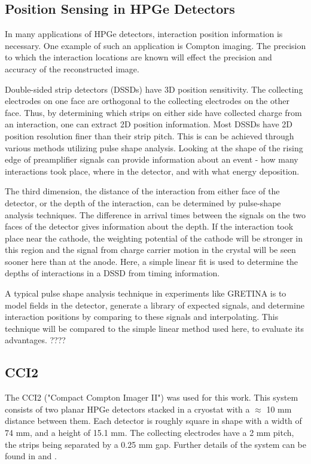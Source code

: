 \subsection*{Position Sensing in HPGe Detectors}

In many applications of HPGe detectors, interaction position information is necessary. One example of such an application is Compton imaging. The precision to which the interaction locations are known will effect the precision and accuracy of the reconstructed image.

Double-sided strip detectors (DSSDs) have 3D position sensitivity. The collecting electrodes on one face are orthogonal to the collecting electrodes on the other face. Thus, by determining which strips on either side have collected charge from an interaction, one can extract 2D position information. Most DSSDs have 2D position resolution finer than their strip pitch. This is can be achieved through various methods utilizing pulse shape analysis. Looking at the shape of the rising edge of preamplifier signals can provide information about an event - how many interactions took place, where in the detector, and with what energy deposition. 

The third dimension, the distance of the interaction from either face of the detector, or the depth of the interaction, can be determined by pulse-shape analysis techniques. The difference in arrival times between the signals on the two faces of the detector gives information about the depth. If the interaction took place near the cathode, the weighting potential of the cathode will be stronger in this region and the signal from charge carrier motion in the crystal will be seen sooner here than at the anode. Here, a simple linear fit is used to determine the depths of interactions in a DSSD from timing information.

A typical pulse shape analysis technique in experiments like GRETINA is to model fields in the detector, generate a library of expected signals, and determine interaction positions by comparing to these signals and interpolating. This technique will be compared to the simple linear method used here, to evaluate its advantages. ????

\subsection*{CCI2}

The CCI2 ("Compact Compton Imager II") was used for this work. This system consists of two planar HPGe detectors stacked in a cryostat with a $\approx$ 10 mm distance between them. Each detector is roughly square in shape with a width of 74 mm, and a height of 15.1 mm. The collecting electrodes have a 2 mm pitch, the strips being separated by a 0.25 mm gap. Further details of the system can be found in \cite{cci22} and \cite{cci21}.